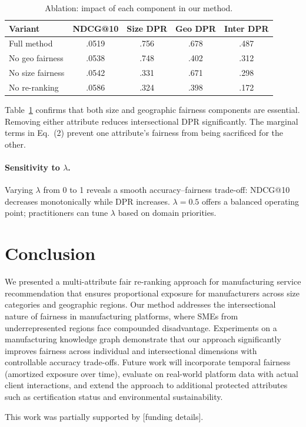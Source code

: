 \documentclass[sigconf,natbib=true]{acmart}
\begin{document}
\begin{table}[t]
\caption{Ablation: impact of each component in our method.}
\label{tab:ablation}
\small
\begin{tabular}{lcccc}
\toprule
\textbf{Variant} & \textbf{NDCG@10} & \textbf{Size DPR} & \textbf{Geo DPR} & \textbf{Inter DPR} \\
\midrule
Full method & .0519 & .756 & .678 & .487 \\
No geo fairness & .0538 & .748 & .402 & .312 \\
No size fairness & .0542 & .331 & .671 & .298 \\
No re-ranking & .0586 & .324 & .398 & .172 \\
\bottomrule
\end{tabular}
\end{table}

Table~\ref{tab:ablation} confirms that both size and geographic fairness components are essential. Removing either attribute reduces intersectional DPR significantly. The marginal terms in Eq.~(2) prevent one attribute's fairness from being sacrificed for the other.

\paragraph{Sensitivity to $\lambda$.} Varying $\lambda$ from 0 to 1 reveals a smooth accuracy--fairness trade-off: NDCG@10 decreases monotonically while DPR increases. $\lambda = 0.5$ offers a balanced operating point; practitioners can tune $\lambda$ based on domain priorities.

\section{Conclusion}
\label{sec:conclusion}

We presented a multi-attribute fair re-ranking approach for manufacturing service recommendation that ensures proportional exposure for manufacturers across size categories and geographic regions. Our method addresses the intersectional nature of fairness in manufacturing platforms, where SMEs from underrepresented regions face compounded disadvantage. Experiments on a manufacturing knowledge graph demonstrate that our approach significantly improves fairness across individual and intersectional dimensions with controllable accuracy trade-offs. Future work will incorporate temporal fairness (amortized exposure over time), evaluate on real-world platform data with actual client interactions, and extend the approach to additional protected attributes such as certification status and environmental sustainability.

\begin{acks}
This work was partially supported by [funding details].
\end{acks}



\end{document}
